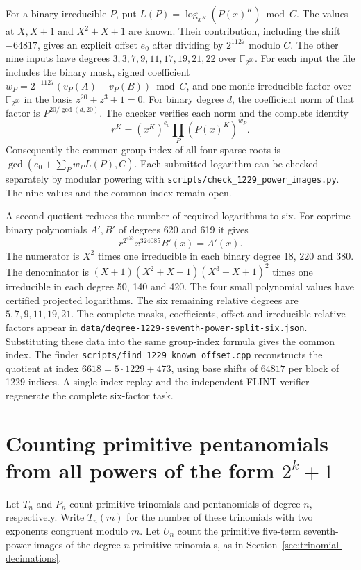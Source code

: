 \documentclass[11pt]{article}
\begin{document}
For a binary irreducible \(P\), put
\(L(P)=\log_{x^K}(P(x)^K)\bmod C\).
The values at \(X,X+1\) and \(X^2+X+1\) are known. Their contribution,
including the shift \(-64817\), gives an explicit offset \(e_0\)
after dividing by \(2^{1127}\) modulo \(C\). The other nine inputs have
degrees \(3,3,7,9,11,17,19,21,22\) over \(\mathbb F_{2^{20}}\).
For each input the file includes the binary mask, signed coefficient
\(w_P=2^{-1127}(v_P(A)-v_P(B))\bmod C\), and one monic irreducible
factor over \(\mathbb F_{2^{20}}\) in the basis \(z^{20}+z^3+1=0\).
For binary degree \(d\), the coefficient norm of that factor is
\(P^{20/\gcd(d,20)}\). The checker verifies each norm and the
complete identity
\[
       r^K=(x^K)^{e_0}\prod_P (P(x)^K)^{w_P}.
\]
Consequently the common group index of all four sparse roots is
\(\gcd(e_0+\sum_P w_P L(P),C)\).
Each submitted logarithm can be checked separately by modular powering
with \nolinkurl{scripts/check_1229_power_images.py}. The nine values
and the common index remain open.

A second quotient reduces the number of required logarithms to six.
For coprime binary polynomials \(A',B'\) of degrees 620 and 619 it gives
\[
                r^{2^{473}}x^{324085}B'(x)=A'(x).
\]
The numerator is \(X^2\) times one irreducible in each binary degree
18, 220 and 380. The denominator is
\((X+1)(X^2+X+1)(X^3+X+1)^2\) times one irreducible in each degree
50, 140 and 420. The four small polynomial values have certified
projected logarithms. The six remaining relative degrees are
\(5,7,9,11,19,21\). The complete masks, coefficients, offset and
irreducible relative factors appear in
\nolinkurl{data/degree-1229-seventh-power-split-six.json}. Substituting
these data into the same group-index formula gives the common index.
The finder \nolinkurl{scripts/find_1229_known_offset.cpp} reconstructs
the quotient at index \(6618=5\cdot1229+473\), using base shifts
of \(64817\) per block of 1229 indices. A single-index replay and
the independent FLINT verifier regenerate the complete six-factor task.

\section{Counting primitive pentanomials from all powers of the form \texorpdfstring{\(2^k+1\)}{2\^k+1}}
\label{sec:all-trinomial-blocks}
Let \(T_n\) and \(P_n\) count primitive trinomials and pentanomials
of degree \(n\), respectively. Write \(T_n(m)\) for the number of
these trinomials with two exponents congruent modulo \(m\).
Let \(U_n\) count the primitive five-term seventh-power images of the
degree-\(n\) primitive trinomials, as in
Section~\ref{sec:trinomial-decimations}.
\end{document}
